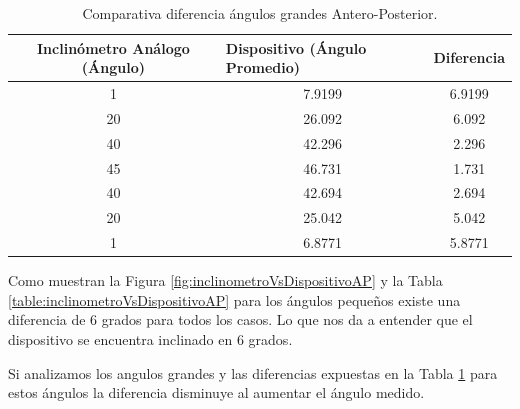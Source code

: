 \documentclass[12pt,a4paper]{article}
\begin{document}
\begin{table}[H]
	\centering
	\begin{tabular}{|c|c|c|}
		\hline
		\textbf{Inclinómetro Análogo (Ángulo)} & \multicolumn{1}{l|}{\textbf{Dispositivo (Ángulo Promedio)}} & Diferencia 				\\ \hline
		1                                      & 7.9199                                                      & 6.9199                     \\ \hline
		20                                      & 26.092                                                      & 6.092                    \\ \hline
		40                                      & 42.296                                                      & 2.296                     \\ \hline
		45                                      & 46.731                                                      & 1.731                     \\ \hline
		40                                      & 42.694                                                      & 2.694                      \\ \hline
		20                                      & 25.042                                                      & 5.042                     \\ \hline
		1                                      & 6.8771                                                      & 5.8771                     \\ \hline
	\end{tabular}
	\caption{Comparativa diferencia ángulos grandes Antero-Posterior.}
	\label{table:inclinometroVsDispositivoAPD}
\end{table}

Como muestran la Figura \ref{fig:inclinometroVsDispositivoAP} y la Tabla \ref{table:inclinometroVsDispositivoAP} para los ángulos pequeños existe una diferencia de 6 grados para todos los casos.
Lo que nos da a entender que el dispositivo se encuentra inclinado en 6 grados.

Si analizamos los angulos grandes y las diferencias expuestas en la Tabla \ref{table:inclinometroVsDispositivoAPD} para estos ángulos la diferencia disminuye al aumentar el ángulo medido.
\end{document}

